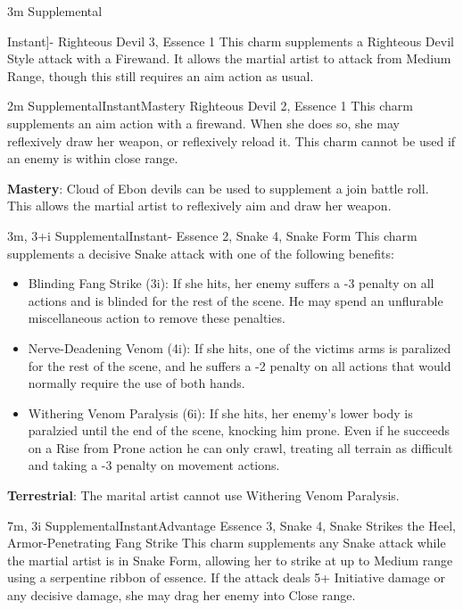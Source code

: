 
{3m}
{Supplemental}{Instant]{-}
{Righteous Devil 3, Essence 1}
This charm supplements a Righteous Devil Style attack with a Firewand.
It allows the martial artist to attack from Medium Range, though this still requires an aim action as usual.

{2m}
{Supplemental}{Instant}{Mastery}
{Righteous Devil 2, Essence 1}
This charm supplements an aim action with a firewand.
When she does so, she may reflexively draw her weapon, or reflexively reload it.
This charm cannot be used if an enemy is within close range.

\textbf{Mastery}: Cloud of Ebon devils can be used to supplement a join battle roll.
This allows the martial artist to reflexively aim and draw her weapon.

 
{3m, 3+i}
{Supplemental}{Instant}{-}
{Essence 2, Snake 4, Snake Form}
This charm supplements a decisive Snake attack with one of the following benefits:

\begin{itemize}
  \item Blinding Fang Strike (3i): If she hits, her enemy suffers a -3 penalty on all actions and is blinded for the rest of the scene. He may spend an unflurable miscellaneous action to remove these penalties.
  \item Nerve-Deadening Venom (4i): If she hits, one of the victims arms is paralized for the rest of the scene, and he suffers a -2 penalty on all actions that would normally require the use of both hands.
  \item Withering Venom Paralysis (6i): If she hits, her enemy's lower body is paralzied until the end of the scene, knocking him prone. Even if he succeeds on a Rise from Prone action he can only crawl, treating all terrain as difficult and taking a -3 penalty on movement actions.
\end{itemize}

\textbf{Terrestrial}: The marital artist cannot use Withering Venom Paralysis.

{7m, 3i}
{Supplemental}{Instant}{Advantage}
{Essence 3, Snake 4, Snake Strikes the Heel, Armor-Penetrating Fang Strike}
This charm supplements any Snake attack while the martial artist is in Snake Form, allowing her to strike at up to Medium range using a serpentine ribbon of essence. If the attack deals 5+ Initiative damage or any decisive damage, she may drag her enemy into Close range.

}
